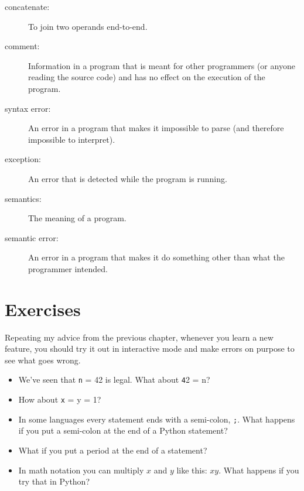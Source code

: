 \documentclass[
DIV=11,
fontsize=12,
twoside,
headinclude=false,
titlepage=firstiscover,
abstract=true,
headsepline=true,
footsepline=true,
chapterprefix=true, %
headings=big,
bibliography=totoc,%
captions=tableheading
]{scrbook}
\theoremstyle{definition}
\begin{document}
\begin{description}
\item[concatenate:]  To join two operands end-to-end.

\item[comment:]  Information in a program that is meant for other
programmers (or anyone reading the source code) and has no effect on the
execution of the program.

\item[syntax error:]  An error in a program that makes it impossible
to parse (and therefore impossible to interpret).

\item[exception:]  An error that is detected while the program is running.

\item[semantics:]  The meaning of a program.

\item[semantic error:]   An error in a program that makes it do something
other than what the programmer intended.

\end{description}


\section{Exercises}

\begin{exercise}
\normalfont

Repeating my advice from the previous chapter, whenever you learn
a new feature, you should try it out in interactive mode and make
errors on purpose to see what goes wrong.

\begin{itemize}

\item We've seen that {\texttt n = 42} is legal.  What about {\texttt 42 = n}?

\item How about {\texttt x = y = 1}?

\item In some languages every statement ends with a semi-colon, {\texttt ;}.
What happens if you put a semi-colon at the end of a Python statement?

\item What if you put a period at the end of a statement?

\item In math notation you can multiply $x$ and $y$ like this: $x y$.
What happens if you try that in Python?

\end{itemize}

\end{exercise}
\end{document}
